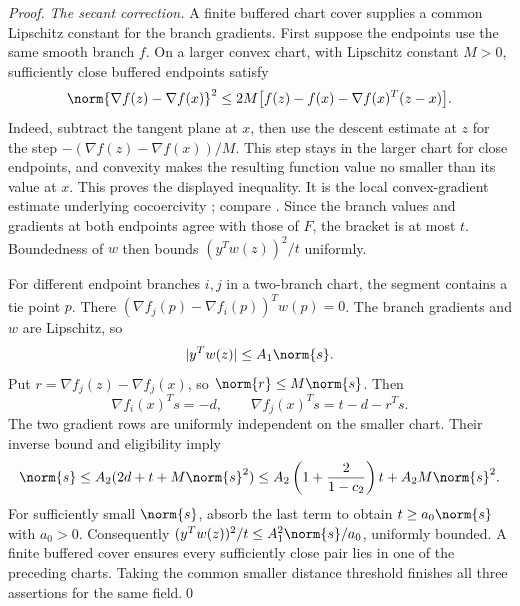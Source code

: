\begin{proof}
\emph{The secant correction.}
A finite buffered chart cover supplies a common Lipschitz constant for the
branch gradients. First suppose the endpoints use the same smooth branch
$f$. On a larger convex chart, with Lipschitz constant $M>0$, sufficiently
close buffered endpoints satisfy
\[
 \norm{\nabla f(z)-\nabla f(x)}^2
 \le2M\bigl[f(z)-f(x)-\nabla f(x)^T(z-x)\bigr].
\]
Indeed, subtract the tangent plane at $x$, then use the descent estimate at
$z$ for the step $-(\nabla f(z)-\nabla f(x))/M$. This step stays in the
larger chart for close endpoints, and convexity makes the resulting
function value no smaller than its value at $x$. This proves the displayed
inequality. It is the local convex-gradient estimate underlying
cocoercivity \cite{WW}; compare .
Since the branch values and gradients
at both endpoints agree with those of $F$, the bracket is at most $t$.
Boundedness of $w$ then bounds $(y^Tw(z))^2/t$ uniformly.

For different endpoint branches $i,j$ in a two-branch chart, the segment
contains a tie point $p$. There
$(\nabla f_j(p)-\nabla f_i(p))^Tw(p)=0$.
The branch gradients and $w$ are Lipschitz, so
\[
 |y^Tw(z)|\le A_1\norm{s}.
\]
Put $r=\nabla f_j(z)-\nabla f_j(x)$,
so $\norm{r}\le M\norm{s}$. Then
\[
 \nabla f_i(x)^Ts=-d,\qquad \nabla f_j(x)^Ts=t-d-r^Ts.
\]
The two gradient rows are uniformly independent on the smaller chart.
Their inverse bound and eligibility imply
\[
 \norm{s}\le A_2(2d+t+M\norm{s}^2)
 \le A_2\left(1+\frac{2}{1-c_2}\right)t+A_2M\norm{s}^2.
\]
For sufficiently small $\norm{s}$, absorb the last term to obtain
$t\ge a_0\norm{s}$ with $a_0>0$.
Consequently $(y^Tw(z))^2/t\le A_1^2\norm{s}/a_0$, uniformly bounded.
A finite buffered cover ensures every sufficiently close pair lies in one
of the preceding charts. Taking the common smaller distance threshold
finishes all three assertions for the same field.\qed
\end{proof}
